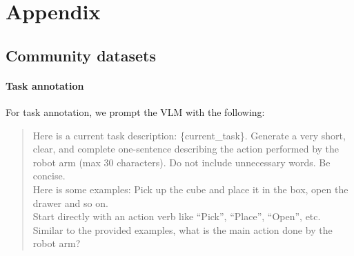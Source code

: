 
\appendix

\section{Appendix}


\subsection{Community datasets}

\label{app:comm_data}

\paragraph{Task annotation}

For task annotation, we prompt the VLM with the following:
\begin{quote}
Here is a current task description: \{current\_task\}. Generate a very short, clear, and complete one-sentence describing the action performed by the robot arm (max 30 characters). Do not include unnecessary words. Be concise.\\
Here is some examples: Pick up the cube and place it in the box, open the drawer and so on.\\
Start directly with an action verb like ``Pick'', ``Place'', ``Open'', etc.\\
Similar to the provided examples, what is the main action done by the robot arm?
\end{quote}

